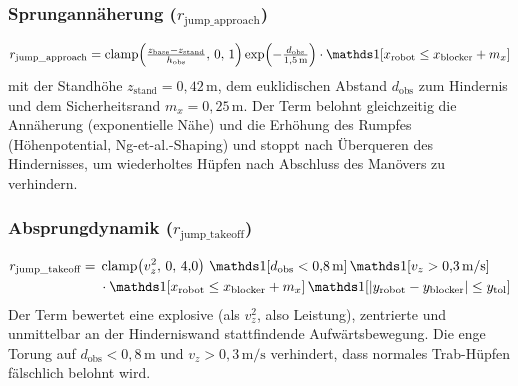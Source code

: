 \subsubsection{Sprungannäherung ($r_{\text{jump\_approach}}$)}
\begin{equation}\label{eq:nav_jump_approach}
r_{\text{jump\_approach}} = \operatorname{clamp}\!\left(\tfrac{z_{\text{base}}-z_{\text{stand}}}{h_{\text{obs}}},\,0,\,1\right)\exp\!\left(-\tfrac{d_{\text{obs}}}{1{,}5\,\text{m}}\right)\cdot \ind[x_{\text{robot}}\le x_{\text{blocker}}+m_x]
\end{equation}
mit der Standhöhe $z_{\text{stand}} = 0{,}42\,\text{m}$, dem euklidischen Abstand $d_{\text{obs}}$ zum Hindernis und dem Sicherheitsrand $m_x=0{,}25\,\text{m}$. Der Term belohnt gleichzeitig die Annäherung (exponentielle Nähe) und die Erhöhung des Rumpfes (Höhenpotential, Ng-et-al.-Shaping) und stoppt nach Überqueren des Hindernisses, um wiederholtes Hüpfen nach Abschluss des Manövers zu verhindern.

\subsubsection{Absprungdynamik ($r_{\text{jump\_takeoff}}$)}
\begin{equation}\label{eq:nav_jump_takeoff}
\begin{aligned}
r_{\text{jump\_takeoff}} ={}& \operatorname{clamp}\!\left(v_z^2,\,0,\,4{,}0\right)\, \ind[d_{\text{obs}}<0{,}8\,\text{m}]\, \ind[v_z>0{,}3\,\text{m/s}] \\
&\cdot \ind[x_{\text{robot}}\le x_{\text{blocker}}+m_x]\, \ind[|y_{\text{robot}}-y_{\text{blocker}}|\le y_{\text{tol}}]
\end{aligned}
\end{equation}
Der Term bewertet eine explosive (als $v_z^2$, also Leistung), zentrierte und unmittelbar an der Hinderniswand stattfindende Aufwärtsbewegung. Die enge Torung auf $d_{\text{obs}}<0{,}8\,\text{m}$ und $v_z>0{,}3\,\text{m/s}$ verhindert, dass normales Trab-Hüpfen fälschlich belohnt wird.

